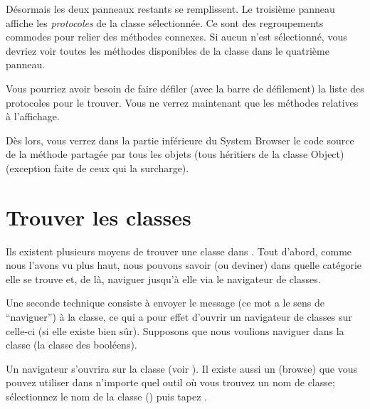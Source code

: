 \documentclass[a4paper,10pt,twoside]{book}
\begin{document}
D\'esormais les deux panneaux restants se remplissent.
Le troisi\`eme panneau affiche les \emph{protocoles} de la classe
s\'electionn\'ee.
Ce sont des regroupements commodes pour relier des m\'ethodes
connexes. Si aucun  n'est s\'electionn\'e, vous devriez
voir toutes les m\'ethodes disponibles de la classe dans le
quatri\`eme panneau.

Vous pourriez avoir besoin de faire d\'efiler (avec la barre de
d\'efilement) la liste des protocoles pour le trouver.
Vous ne verrez maintenant que les m\'ethodes relatives \`a
l'affichage.

D\`es lors, vous verrez dans la partie inf\'erieure du System Browser
le code source de la m\'ethode  partag\'ee par tous
les objets 
(tous h\'eritiers de la classe Object)
(exception faite de ceux qui la surcharge).

\section{Trouver les classes}

Ils existent plusieurs moyens de trouver une classe dans \sq.
Tout d'abord, comme nous l'avons vu plus haut, nous pouvons savoir (ou
deviner) dans quelle cat\'egorie elle se trouve et, de l\`a, naviguer
jusqu'\`a elle via le navigateur de classes.

Une seconde technique consiste \`a envoyer le message 
(ce mot a le sens de ``naviguer'') \`a la classe, ce qui a pour effet
d'ouvrir un navigateur de classes sur celle-ci
(si elle existe bien s\^ur).
Supposons que nous voulions naviguer dans la classe 
(la classe des bool\'eens).

Un navigateur s'ouvrira sur la classe  (voir ).
Il existe aussi un   (browse) que vous
pouvez utiliser dans n'importe quel outil o\`u vous trouvez un nom de
classe;
s\'electionnez le nom de la classe 
(\parex {})
puis tapez .
\end{document}
